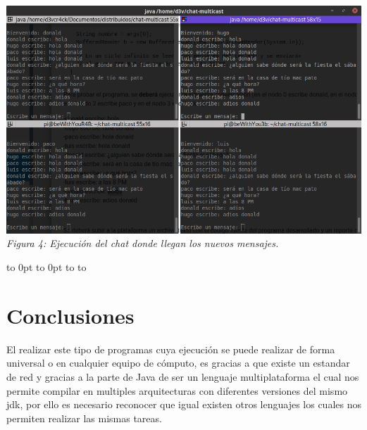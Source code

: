 \documentclass[10pt,executivepaper]{article}
\def\fillandplacepagenumber{%
 \par\pagestyle{empty}%
 \vbox to 0pt{\vss}\vfill
 \vbox to 0pt{\baselineskip0pt
   \hbox to\linewidth{\hss}%
   \baselineskip\footskip
   \hbox to\linewidth{%
     \hfil\thepage\hfil}\vss}}
\begin{document}
\begin{center}
\begin{landscape}
    \includegraphics[scale=0.5]{img/terminal-chat.png}
    \\\textit{Figura 4: Ejecución del chat donde llegan los nuevos mensajes.}
    \fillandplacepagenumber
  \end{landscape}
\end{center}

\section{Conclusiones}
El realizar este tipo de programas cuya ejecución se puede realizar de forma universal o en cualquier equipo de cómputo, es gracias a que existe un estandar de red y gracias a la parte de Java de ser un lenguaje multiplataforma el cual nos permite compilar en multiples arquitecturas con diferentes versiones del mismo jdk, por ello es necesario reconocer que igual existen otros lenguajes los cuales nos permiten realizar las mismas tareas.
\end{document}
